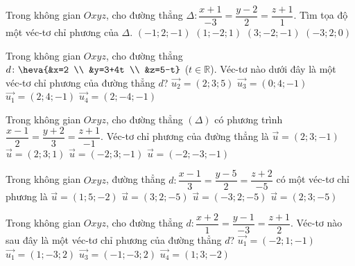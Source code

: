 \begin{ex}%
	Trong không gian $Oxyz$, cho đường thẳng $\Delta \colon \dfrac{x+1}{-3}=\dfrac{y-2}{2}=\dfrac{z+1}{1}$. Tìm tọa độ một véc-tơ chỉ phương của $\Delta$.
	\choice
	{$(-1;2;-1)$}
	{$(1;-2;1)$}
	{\True $(3;-2;-1)$}
	{$(-3;2;0)$}
\end{ex}

\begin{ex}%
	Trong không gian $Oxyz$, cho đường thẳng $d \colon \heva{&x=2 \\ &y=3+4t \\ &z=5-t}$ ($t \in \mathbb{R}$). Véc-tơ nào dưới đây là một véc-tơ chỉ phương của đường thẳng $d$?
	\choice
	{$\overrightarrow{u_2}=(2;3;5)$}
	{\True $\overrightarrow{u_3}=(0;4;-1)$}
	{$\overrightarrow{u_1}=(2;4;-1)$}
	{$\overrightarrow{u_4}=(2;-4;-1)$}
\end{ex}

\begin{ex}%
	Trong không gian $Oxyz$, cho đường thẳng $(\Delta)$ có phương trình $\dfrac{x-1}{2}=\dfrac{y+2}{3}=\dfrac{z+1}{-1}$. Véc-tơ chỉ phương của đường thẳng là
	\choice
	{\True $\overrightarrow{u}=(2;3;-1)$}
	{$\overrightarrow{u}=(2;3;1)$}
	{$\overrightarrow{u}=(-2;3;-1)$}
	{$\overrightarrow{u}=(-2;-3;-1)$}
\end{ex}

\begin{ex}%
	Trong không gian $Oxyz$, đường thẳng $d \colon \dfrac{x-1}{3}=\dfrac{y-5}{2}=\dfrac{z+2}{-5}$ có một véc-tơ chỉ phương là
	\choice
	{$\overrightarrow{u}=(1;5;-2)$}
	{\True $\overrightarrow{u}=(3;2;-5)$}
	{$\overrightarrow{u}=(-3;2;-5)$}
	{$\overrightarrow{u}=(2;3;-5)$}
\end{ex}
\begin{ex}%
	Trong không gian $Oxyz$, cho đường thẳng $d \colon \dfrac{x+2}{1}=\dfrac{y-1}{-3}=\dfrac{z+1}{2}$. Véc-tơ nào sau đây là một véc-tơ chỉ phương của đường thẳng $d$?
	\choice
	{$\overrightarrow{u_1}=(-2;1;-1)$}
	{\True $\overrightarrow{u_1}=(1;-3;2)$}
	{$\overrightarrow{u_3}=(-1;-3;2)$}
	{$\overrightarrow{u_4}=(1;3;-2)$}
\end{ex}

